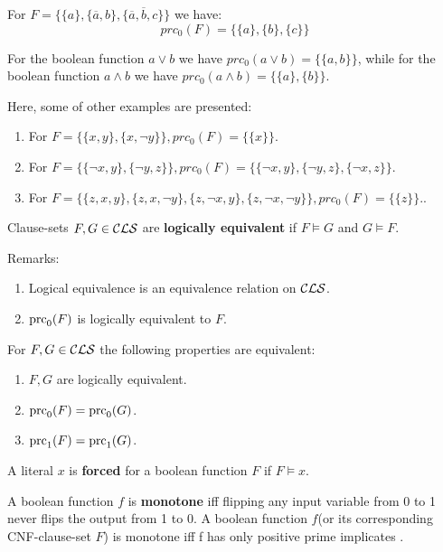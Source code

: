 \documentclass[]{book}
\begin{document}
\begin{examp}\label{exp:aaa}
      For $F = \{ \{a\}, \{ \overline a, b \}, \{ \overline a, \overline b, c \} \}$ we have:
      $$ prc_0(F) = \{ \{a\}, \{ b \}, \{ c \} \} $$
\end{examp}

\begin{examp}\label{exp:imp3}
      For the boolean function $ a \vee b$ we have $prc_0(a \vee b) = \{ \{a, b \} \}$, while for the boolean function 
	  $a \wedge b$ we have $prc_0(a \wedge b) = \{ \{ a \}, \{b\}\}$.
\end{examp}

\begin{examp}\label{exp:bbb}
      Here, some of other examples are presented:
	  \begin{enumerate}
	        \item For $F = \{\{x, y\} , \{x,\neg y\}\}, prc_0(F) = \{\{x\}\}$.
			\item For $F = \{\{ \neg x, y\} , \{ \neg y, z\}\}, prc_0(F) = \{\{\neg x, y\} , \{\neg y, z\} , \{\neg x, z\}\}$.
			\item For $F = \{\{z, x, y\} , \{z, x, \neg y\} , \{z, \neg x, y\} , \{z,\neg x, \neg y\}\}, prc_0(F) = \{\{z\}\}.$.
      \end{enumerate}
\end{examp}

\begin{defi}\label{def:logequiv}
  Clause-sets $F, G \in \mathcal{CLS}$ are \textbf{logically equivalent} if $F \models G$ and $G \models F$.
\end{defi}
Remarks:
\begin{enumerate}
\item Logical equivalence is an equivalence relation on $\mathcal{CLS}$.
\item $\operatorname{prc}_0(F)$ is logically equivalent to $F$.
\end{enumerate}

\begin{lem}\label{lem:logequiv}
  For $F, G \in \mathcal{CLS}$ the following properties are equivalent:
  \begin{enumerate}
  \item $F, G$ are logically equivalent.
  \item $\operatorname{prc}_0(F) = \operatorname{prc}_0(G)$.
  \item $\operatorname{prc}_1(F) = \operatorname{prc}_1(G)$.
  \end{enumerate}
\end{lem}

\begin{defi}\label{def:forced1}
      A literal $x$ is \textbf{forced} for a boolean function $F$ if $F \models x$.
\end{defi}
\begin{defi}\label{def:imp3}
      A boolean function $f$ is \textbf{monotone} iff flipping any input variable from 0 to 1 never flips the output from 1 to 0.
	  A boolean function $f$(or its corresponding CNF-clause-set $F$) is monotone iff f has only positive prime implicates \cite{h8}.
\end{defi}
\end{document}
